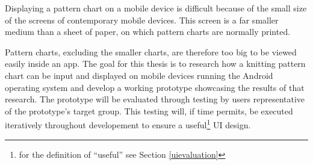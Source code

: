 Displaying a pattern chart on a mobile device is difficult because of the small size of the screens of contemporary mobile devices. This screen is a far smaller medium than a sheet of paper, on which pattern charts are normally printed. 

Pattern charts, excluding the smaller charts, are therefore too big to be viewed easily inside an app. The goal for this thesis is to research how a knitting pattern chart can be input and displayed on mobile devices running the Android operating system and develop a working prototype showcasing the results of that research. The prototype will be evaluated through testing by users representative of the prototype's target group. This testing will, if time permits, be executed iteratively throughout developement to ensure a useful\footnote{for the definition of ``useful'' see Section \ref{uievaluation}} \gls{UI} design.